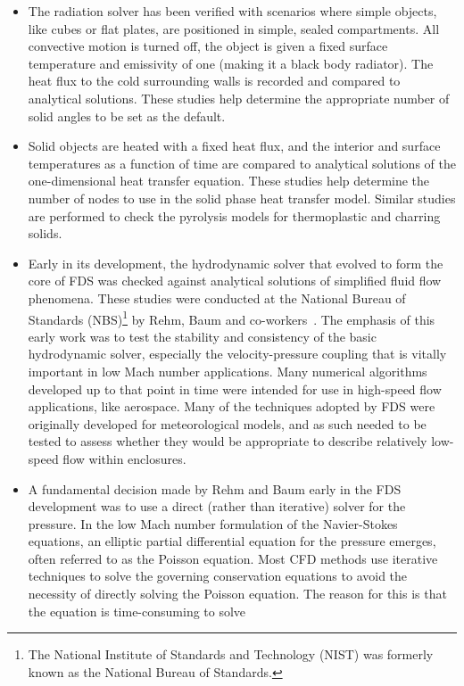 \documentclass[11pt]{book}
\begin{document}
\begin{itemize}
\item The radiation solver has been verified with scenarios where
simple objects, like cubes or flat plates, are positioned in simple,
sealed compartments. All convective motion is turned off, the object
is given a fixed surface temperature and emissivity of one (making it
a black body radiator). The heat flux to the cold surrounding walls is
recorded and compared to analytical solutions.  These studies help
determine the appropriate number of solid angles to be set as the
default.
\item Solid objects are heated with a fixed heat flux, and the
interior and surface temperatures as a function of time are compared
to analytical solutions of the one-dimensional heat transfer
equation. These studies help determine the number of nodes to use in
the solid phase heat transfer model. Similar studies are performed to
check the pyrolysis models for thermoplastic and charring solids.
\item Early in its development, the hydrodynamic solver that evolved
to form the core of FDS was checked against analytical solutions of
simplified fluid flow phenomena. These studies were conducted at the
National Bureau of Standards (NBS)\footnote{The National Institute of
Standards and Technology (NIST) was formerly known as the National
Bureau of Standards.} by Rehm, Baum and
co-workers~\cite{Rehm:SIAM83,Rehm:SIAM84,Baum:CST84,Rehm:ANM85}. The
emphasis of this early work was to test the stability and consistency
of the basic hydrodynamic solver, especially the velocity-pressure
coupling that is vitally important in low Mach number
applications. Many numerical algorithms developed up to that point in
time were intended for use in high-speed flow applications, like
aerospace. Many of the techniques adopted by FDS were originally
developed for meteorological models, and as such needed to be tested
to assess whether they would be appropriate to describe relatively
low-speed flow within enclosures.
\item A fundamental decision made by Rehm and Baum early in the FDS
development was to use a direct (rather than iterative) solver for the
pressure. In the low Mach number formulation of the Navier-Stokes
equations, an elliptic partial differential equation for the pressure
emerges, often referred to as the Poisson equation. Most CFD methods
use iterative techniques to solve the governing conservation equations
to avoid the necessity of directly solving the Poisson equation. The
reason for this is that the equation is time-consuming to solve

\end{itemize}
\end{document}
